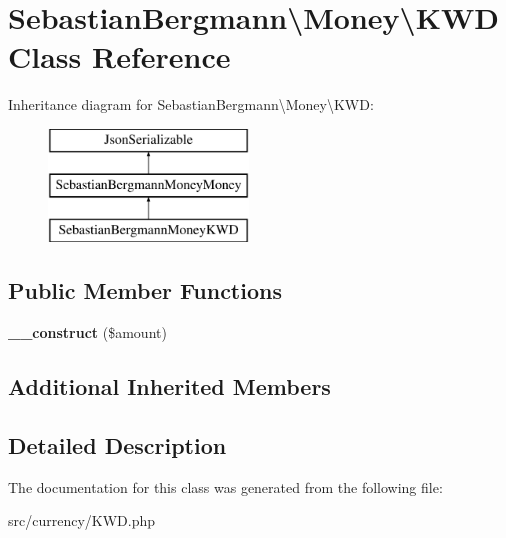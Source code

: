 \hypertarget{classSebastianBergmann_1_1Money_1_1KWD}{}\section{Sebastian\+Bergmann\textbackslash{}Money\textbackslash{}K\+W\+D Class Reference}
\label{classSebastianBergmann_1_1Money_1_1KWD}
Inheritance diagram for Sebastian\+Bergmann\textbackslash{}Money\textbackslash{}K\+W\+D\+:\begin{figure}[H]
\begin{center}
\leavevmode
\includegraphics[height=3.000000cm]{classSebastianBergmann_1_1Money_1_1KWD}
\end{center}
\end{figure}
\subsection*{Public Member Functions}
\begin{DoxyCompactItemize}
\item 
\hypertarget{classSebastianBergmann_1_1Money_1_1KWD_af12ccbd67c5ee0552cf48abc680e33b3}{}{\bfseries \+\_\+\+\_\+construct} (\$amount)\label{classSebastianBergmann_1_1Money_1_1KWD_af12ccbd67c5ee0552cf48abc680e33b3}

\end{DoxyCompactItemize}
\subsection*{Additional Inherited Members}


\subsection{Detailed Description}


The documentation for this class was generated from the following file\+:\begin{DoxyCompactItemize}
\item 
src/currency/K\+W\+D.\+php\end{DoxyCompactItemize}
